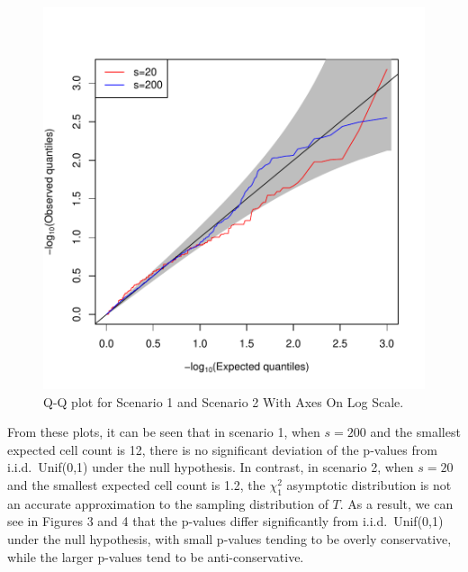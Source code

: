\documentclass[article]{jss}
\begin{document}
\begin{figure}
\begin{center}
\includegraphics{manuscript-chisq_qq_log}
\end{center}
\caption{Q-Q plot for Scenario 1 and Scenario 2 With Axes On Log Scale.}
\end{figure}

From these plots, it can be seen that in scenario 1, when $s=200$ and the smallest expected cell count is 12, there is no significant deviation of the p-values from i.i.d.\ Unif(0,1) under the null hypothesis.  In contrast, in scenario 2, when $s=20$ and the smallest expected cell count is 1.2, the $\chi^2_1$ asymptotic distribution is not an accurate approximation to the sampling distribution of $T$.  As a result, we can see in Figures 3 and 4 that the p-values differ significantly from i.i.d.\ Unif(0,1) under the null hypothesis, with small p-values tending to be overly conservative, while the larger p-values tend to be anti-conservative.
\end{document}
